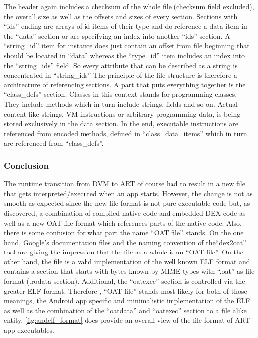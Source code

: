 The header again includes a checksum of the whole file (checksum
field excluded), the overall size as well as the offsets and sizes
of every section. Sections with ``ids'' ending are arrays of
id items of their type and do reference
a data item in the ``data'' section or are specifying
an index into another ``ids'' section. A ``string\_id'' item for
instance does just contain an offset from file beginning
that should be located in ``data'' whereas the ``type\_id'' item
includes an index into the ``string\_ids'' field. So every
attribute that can be described as a string is concentrated in ``string\_ids'' The principle of the file structure is therefore a architecture of referencing
sections. A part that puts everything together is the ``class\_defs''
section. Classes in this context stands for programming classes. They include methods which in turn include strings, fields and so on. Actual content like
strings, VM instructions or arbitrary programming data, is being stored exclusively in the data section. In the end, executable instructions are referenced from encoded methods, defined in ``class\_data\_items'' which in turn are referenced from ``class\_defs''.


\subsubsection{Conclusion}\label{section:andelf_format_conclusion}
The runtime transition from DVM to ART of course had to result
in a new file that gets interpreted/executed when an app starts.
However, the change is not as smooth as expected since
the new file format is not pure executable code but, as
discovered, a combination of compiled native code
and embedded DEX code as well as a new OAT file format
which references parts of the native code. Also, there is some
confusion for what part the name ``OAT file'' stands. On the
one hand, Google's documentation files and the naming
convention of the``dex2oat'' tool are giving the impression
that the file as a whole is an ``OAT file''. On
the other hand, the file is a valid implementation of the
well known ELF format and contains a section that starts
with bytes known by MIME types with ``.oat'' as file format
(.rodata section). Additional, the ``oatexec'' section
is controlled via the greater ELF format. Therefore
, ``OAT file'' stands most likely for both of those meanings, the
Android app specific and minimalistic implementation of the ELF
as well as the combination of the ``oatdata'' and ``oatexec''
section to a file alike entity. \autoref{fig:andelf_format} does
provide an overall view of the file format of ART app executables.

